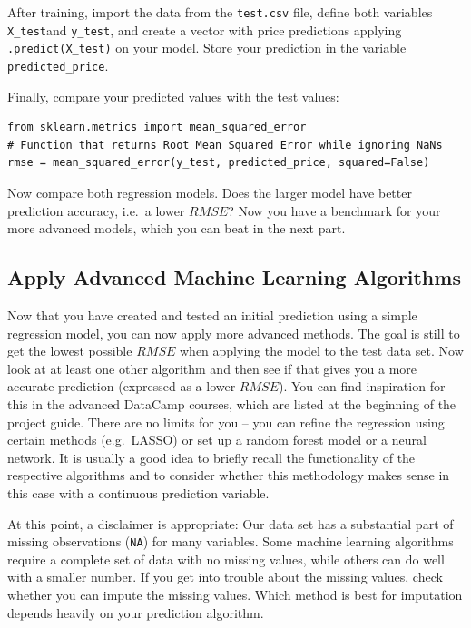 \documentclass[
  11pt,
]{article}
\newenvironment{tipsp}[1]
  {
  \begin{itemize}
  \footnotesize
  \renewcommand{\labelitemi}{
    \raisebox{-.7\height}[0pt][0pt]{
      {\setkeys{Gin}{width=3em,keepaspectratio}
        \texttt{[image: images/\#1.png]}}
    }
  }
  \setlength{\fboxsep}{1em}
  \begin{pbox}
  \item
  }
  {
  \end{pbox}
  \end{itemize}
  }
\begin{document}
\begin{tipsp}p

After training, import the data from the \texttt{test.csv} file, define both variables \texttt{X\_test}and \texttt{y\_test}, and create a vector with price predictions applying \texttt{.predict(X\_test)} on your model. Store your prediction in the variable \texttt{predicted\_price}.

Finally, compare your predicted values with the test values:

\begin{verbatim}
from sklearn.metrics import mean_squared_error
# Function that returns Root Mean Squared Error while ignoring NaNs
rmse = mean_squared_error(y_test, predicted_price, squared=False)
\end{verbatim}

\end{tipsp}

Now compare both regression models. Does the larger model have better prediction accuracy, i.e.~a lower \(RMSE\)? Now you have a benchmark for your more advanced models, which you can beat in the next part.

\hypertarget{apply-advanced-machine-learning-algorithms}{%
\subsection{Apply Advanced Machine Learning Algorithms}\label{apply-advanced-machine-learning-algorithms}}

Now that you have created and tested an initial prediction using a simple regression model, you can now apply more advanced methods. The goal is still to get the lowest possible \(RMSE\) when applying the model to the test data set. Now look at at least one other algorithm and then see if that gives you a more accurate prediction (expressed as a lower \(RMSE\)). You can find inspiration for this in the advanced DataCamp courses, which are listed at the beginning of the project guide. There are no limits for you -- you can refine the regression using certain methods (e.g.~LASSO) or set up a random forest model or a neural network. It is usually a good idea to briefly recall the functionality of the respective algorithms and to consider whether this methodology makes sense in this case with a continuous prediction variable.

At this point, a disclaimer is appropriate: Our data set has a substantial part of missing observations (\texttt{NA}) for many variables. Some machine learning algorithms require a complete set of data with no missing values, while others can do well with a smaller number. If you get into trouble about the missing values, check whether you can impute the missing values. Which method is best for imputation depends heavily on your prediction algorithm.
\end{document}
